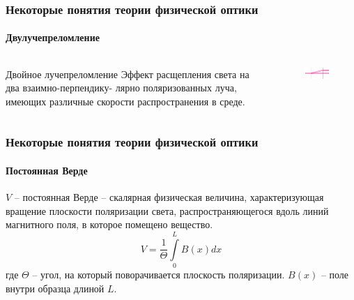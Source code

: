 \documentclass[12pt,pdf,hyperref={unicode}, dvipsnames]{beamer}
\begin{document}
\begin{frame}[t]
  \frametitle{Некоторые понятия теории физической оптики}
  \framesubtitle{Двулучепреломление}
\begin{columns}
\begin{column}{0.5\textwidth}
   \begin{block}{Двойное лучепреломление}
		Эффект расщепления света на два взаимно-перпендику- лярно поляризованных луча, имеющих  различные скорости распространения  в  среде.
	\end{block}
\end{column}
\begin{column}{0.5\textwidth}  %
\begin{figure}[tb]
    \centering
    \includegraphics[width=\textwidth]{img/dvp}
  \end{figure}	
\end{column}
\end{columns}

\end{frame}

\begin{frame}[t]
  \frametitle{Некоторые понятия теории физической оптики}
  \framesubtitle{Постоянная Верде}
 $V$ -- постоянная Верде -- скалярная физическая величина, характеризующая вращение плоскости поляризации света, распространяющегося вдоль линий магнитного поля, в которое помещено вещество.
\begin{equation}
	V=\frac{1}{\Theta}\int\limits_{0}^{L}B(x)dx
\end{equation}
где $\Theta$ -- угол, на который поворачивается плоскость поляризации.
$B(x)$ -- поле внутри образца длиной $L$.
\end{frame} 
\end{document}
